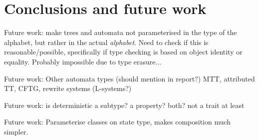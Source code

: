 \section{Conclusions and future work}


Future work: make trees and automata not parameterised in the type of the
alphabet, but rather in the actual \emph{alphabet}. Need to check if this
is reasonable/possible, specifically if type checking is based on object
identity or equality. Probably impossible due to type erasure...

Future work: Other automata types (should mention in report?) MTT,
       attributed TT, CFTG, rewrite systems (L-systems?)

Future work: is deterministic a subtype? a property? both? not a trait at
least

Future work: Parameterise classes on state type, makes composition much
simpler.


